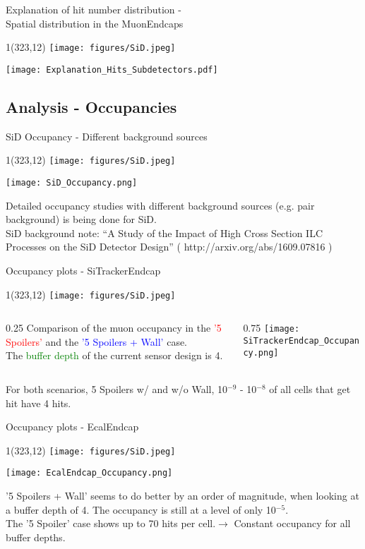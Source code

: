 \documentclass[xcolor={dvipsnames}]{beamer}
\newcommand{\sidlogo}{
  \setlength{\TPHorizModule}{1pt}
  \setlength{\TPVertModule}{1pt}
  \begin{textblock}{1}(323,12)
   \texttt{[image: figures/SiD.jpeg]}
  \end{textblock}
  }
\begin{document}
\begin{frame}{Explanation of hit number distribution -\\ \small Spatial distribution in the MuonEndcaps}
\sidlogo
 \begin{center}
\texttt{[image: Explanation\_Hits\_Subdetectors.pdf]}
\end{center}
\end{frame}

\subsection{Analysis - Occupancies}
\begin{frame}{SiD Occupancy - Different background sources}
\sidlogo
 \begin{center}
\texttt{[image: SiD\_Occupancy.png]}
\end{center}
Detailed occupancy studies with different background sources (e.g. pair background) is being done for SiD.\\
SiD background note: ``A Study of the Impact of High Cross Section ILC Processes on the SiD Detector Design'' \small ( http://arxiv.org/abs/1609.07816 )
\end{frame}
\begin{frame}{Occupancy plots - \small SiTrackerEndcap}
\sidlogo
\begin{columns}
 \begin{column}{0.25\textwidth}
 \small
  Comparison of the muon occupancy in the \textcolor{red}{'5 Spoilers'} and the \textcolor{blue}{'5 Spoilers + Wall'} case.\\{\small The \textcolor{green}{buffer depth} of the current sensor design is 4.}
 \end{column}
 \begin{column}{0.75\textwidth}
\texttt{[image: SiTrackerEndcap\_Occupancy.png]}
\end{column}
\end{columns}
For both scenarios, 5 Spoilers w/ and w/o Wall, 10$^{-9}$ - 10$^{-8}$ of all cells that get hit have 4 hits.
\end{frame}
\begin{frame}{Occupancy plots - \small EcalEndcap}
\sidlogo
 \begin{center}
\texttt{[image: EcalEndcap\_Occupancy.png]}
\end{center}
\small '5 Spoilers + Wall' seems to do better by an order of magnitude, when looking at a buffer depth of 4. The occupancy is still at a level of only 10$^{-5}$.\\
\small The '5 Spoiler' case shows up to 70 hits per cell.$\rightarrow$ Constant occupancy for all buffer depths.
\end{frame}
\end{document}
